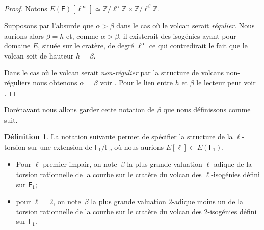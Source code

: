 \documentclass[10pt,a4paper]{book}
\theoremstyle{plain}
\theoremstyle{definition}
\theoremstyle{definition}
\theoremstyle{definition}
\theoremstyle{definition}
\theoremstyle{definition}
\newtheorem{defi}[thm]{Définition}
\theoremstyle{remark}
\theoremstyle{remark}
\theoremstyle{definition}
\begin{document}
\begin{proof}
Notons $E(\mathsf{F})[\ell^{\infty}]\simeq \mathbb{Z}/ \ell^{\alpha} \mathbb{Z} 
\times \mathbb{Z}/ \ell^{\beta} \mathbb{Z}$. 

Supposons par l'absurde que $\alpha > \beta$ dans le cas où le volcan serait 
\emph{régulier}. Nous aurions alors $\beta=h$ et, comme $\alpha>\beta$, il 
existerait des isogénies ayant pour domaine $E$, située sur le cratère, de 
degré $\ell^{\alpha}$ ce qui contredirait le fait que le volcan soit de hauteur 
$h=\beta$. 

Dans le cas où le volcan serait 
\emph{non-régulier} par la structure de volcans non-réguliers nous obtenons
$\alpha=\beta$ voir \cite[§5.3.1]{Ionica2010}. Pour le lien entre $h$ et
 $\beta$ le lecteur peut voir \cite[§5.3.1]{Ionica2010}. 
\end{proof}

Dorénavant nous allons garder cette notation de $\beta$ que nous définissons 
comme suit.

\begin{defi}
\label{def:bet:atk}
La notation suivante permet de spécifier la structure de la 
$\ell$-torsion sur une extension de $\mathsf{F}_1 /\mathbb{F}_q$ où nous 
aurions $E[\ell] \subset E(\mathsf{F}_1)$.
\begin{itemize}
\item Pour $\ell$ premier impair, on note~$\beta$ la plus
grande valuation $\ell$-adique de la torsion rationnelle de la courbe sur le 
cratère du volcan des $\ell$-isogénies défini sur $\mathsf{F}_1$; 
\item pour $\ell=2$, on note~$\beta$ la plus
grande valuation $2$-adique moins un de la torsion rationnelle de la courbe sur
le cratère du volcan des $2$-isogénies défini sur $\mathsf{F}_1$.
\end{itemize}
\end{defi}

\end{document}
